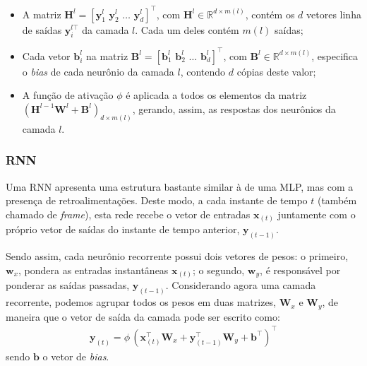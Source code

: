 \documentclass[a4paper]{article}
\begin{document}
\begin{multicols}{2}
\begin{itemize}[noitemsep]
    \item A matriz $\mathbf{H}^l = [\mathbf{y}_{1}^l \,\, \mathbf{y}_{2}^l \,\, \dots \,\, \mathbf{y}_{d}^l]^\top$, com $\mathbf{H}^l \in \mathbb{R}^{d \times m(l)}$, contém os $d$ vetores linha de saídas $\mathbf{y}_{i}^{l \top}$ da camada $l$. Cada um deles contém $m(l)$ saídas;
    \item Cada vetor $\mathbf{b}_{i}^{l}$ na matriz $\mathbf{B}^l = [\mathbf{b}_{1}^l \,\, \mathbf{b}_{2}^l \,\, \dots \,\, \mathbf{b}_{d}^l]^\top$, com $\mathbf{B}^l \in \mathbb{R}^{d \times m(l)}$, especifica o \textit{bias} de cada neurônio da camada $l$, contendo $d$ cópias deste valor;
    \item A função de ativação $\phi$ é aplicada a todos os elementos da matriz $(\mathbf{H}^{l-1}\mathbf{W}^l + \mathbf{B}^l)_{d \times m(l)}$, gerando, assim, as respostas dos neurônios da camada $l$. 
\end{itemize}

\subsubsection{RNN}
\label{subsubsec:RNNsimples_descricao}

Uma RNN apresenta uma estrutura bastante similar à de uma MLP, mas com a presença de retroalimentações. Deste modo, a cada instante de tempo $t$ (também chamado de \emph{frame}), esta rede recebe o vetor de entradas $\mathbf{x}_{(t)}$ juntamente com o próprio vetor de saídas do instante de tempo anterior, $\mathbf{y}_{(t-1)}$.

    Sendo assim, cada neurônio recorrente possui dois vetores de pesos: o primeiro, $\mathbf{w}_x$, pondera as entradas instantâneas $\mathbf{x}_{(t)}$; o segundo, $\mathbf{w}_y$, é responsável por ponderar as saídas passadas, $\mathbf{y}_{(t-1)}$. Considerando agora uma camada recorrente, podemos agrupar todos os pesos em duas matrizes, $\mathbf{W}_x$ e $\mathbf{W}_y$, de maneira que o vetor de saída da camada pode ser escrito como:
\begin{equation}
\begin{aligned}
\mathbf{y}_{(t)} = \phi\,(\mathbf{x}_{(t)}^\top\mathbf{W}_x + \mathbf{y}_{(t-1)}^\top\mathbf{W}_y + \mathbf{b}^\top)^\top
\label{eq:RNN_camada_padrão}
\end{aligned}
\end{equation}
sendo $\mathbf{b}$ o vetor de \textit{bias}. 


\end{multicols}
\end{document}
